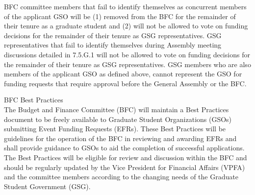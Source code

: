 \begin{bylaws-number}
  \item BFC committee members that fail to identify themselves as concurrent members of the applicant GSO will be (1) removed from the BFC for the remainder of their tenure as a graduate student and (2) will not be allowed to vote on funding decisions for the remainder of their tenure as GSG representatives. GSG representatives that fail to identify themselves during Assembly meeting discussions detailed in 7.5.G.1 will not be allowed to vote on funding decisions for the remainder of their tenure as GSG representatives. GSG members who are also members of the applicant GSO as defined above, cannot represent the GSO for funding requests that require approval before the General Assembly or the BFC.
  \item BFC Best Practices \hfill \\
  The Budget and Finance Committee (BFC) will maintain a Best Practices document to be freely available to Graduate Student Organizations (GSOs) submitting Event Funding Requests (EFRs). These Best Practices will be guidelines for the operation of the BFC in reviewing and awarding EFRs and shall provide guidance to GSOs to aid the completion of successful applications. The Best Practices will be eligible for review and discussion within the BFC and should be regularly updated by the Vice President for Financial Affairs (VPFA) and the committee members according to the changing needs of the Graduate Student Government (GSG).
\end{bylaws-number}